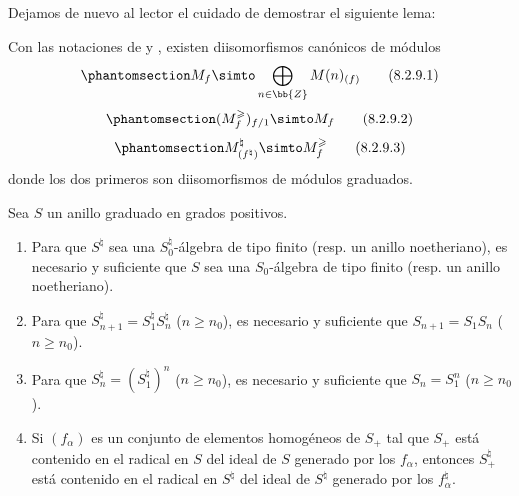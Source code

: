 \documentclass[oneside,10pt]{amsart}
\renewcommand{\geq}{\geqslant}
\let\EGAOriginalLabel\label
\renewcommand{\label}[1]{\phantomsection\EGAOriginalLabel{#1}}
\begin{document}
Dejamos de nuevo al lector el cuidado de demostrar el siguiente lema:
\begin{lemma}[8.2.9]
\label{II.8.2.9}
Con las notaciones de  y , existen diisomorfismos canónicos de módulos
\[
\label{II.8.2.9.1}
  M_f \simto \bigoplus_{n\in\bb{Z}} M(n)_{(f)}
\tag{8.2.9.1}
\]
\[
\label{II.8.2.9.2}
  (M_f^\geq)_{f/1} \simto M_f
\tag{8.2.9.2}
\]
\[
\label{II.8.2.9.3}
  M_{(f^\natural)}^\natural \simto M_f^\geq
\tag{8.2.9.3}
\]
donde los dos primeros son diisomorfismos de módulos graduados.
\end{lemma}

\begin{lemma}[8.2.10]
\label{II.8.2.10}
Sea $S$ un anillo graduado en grados positivos.
\begin{enumerate}
  \item[\rm{(i)}] Para que $S^\natural$ sea una $S_0^\natural$-álgebra de tipo finito \textup{(resp.} un anillo noetheriano\textup{)}, es necesario y suficiente que $S$ sea una $S_0$-álgebra de tipo finito \textup{(resp.} un anillo noetheriano\textup{)}.
  \item[\rm{(ii)}] Para que $S_{n+1}^\natural = S_1^\natural S_n^\natural$ ($n\geq n_0$), es necesario y suficiente que $S_{n+1}=S_1S_n$ ($n\geq n_0$).
  \item[\rm{(iii)}] Para que $S_n^\natural = (S_1^\natural)^n$ ($n\geq n_0$), es necesario y suficiente que $S_n=S_1^n$ ($n\geq n_0$).
  \item[\rm{(iv)}] Si $(f_\alpha)$ es un conjunto de elementos homogéneos de $S_+$ tal que $S_+$ está contenido en el radical en $S$ del ideal de $S$ generado por los $f_\alpha$, entonces $S_+^\natural$ está contenido en el radical en $S^\natural$ del ideal de $S^\natural$ generado por los $f_\alpha^\natural$.
\end{enumerate}
\end{lemma}
\end{document}
